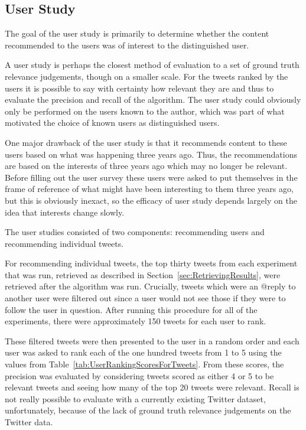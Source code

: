 \subsection{User Study}
\label{sec:UserStudy}

The goal of the user study is primarily to determine whether the content recommended to the users was of interest to the distinguished user.

A user study is perhaps the closest method of evaluation to a set of ground truth relevance judgements, though on a smaller scale. For the tweets ranked by the users it is possible to say with certainty how relevant they are and thus to evaluate the precision and recall of the algorithm. The user study could obviously only be performed on the users known to the author, which was part of what motivated the choice of known users as distinguished users.

One major drawback of the user study is that it recommends content to these users based on what was happening three years ago. Thus, the recommendations are based on the interests of three years ago which may no longer be relevant. Before filling out the user survey these users were asked to put themselves in the frame of reference of what might have been interesting to them three years ago, but this is obviously inexact, so the efficacy of user study depends largely on the idea that interests change slowly.

The user studies consisted of two components: recommending users and recommending individual tweets. 

For recommending individual tweets, the top thirty tweets from each experiment that was run, retrieved as described in Section~\ref{sec:RetrievingResults}, were retrieved after the algorithm was run. Crucially, tweets which were an @reply to another user were filtered out since a user would not see those if they were to follow the user in question. After running this procedure for all of the experiments, there were approximately 150 tweets for each user to rank.

These filtered tweets were then presented to the user in a random order and each user was asked to rank each of the one hundred tweets from 1 to 5 using the values from Table~\ref{tab:UserRankingScoresForTweets}. From these scores, the precision was evaluated by considering tweets scored as either 4 or 5 to be relevant tweets and seeing how many of the top 20 tweets were relevant. Recall is not really possible to evaluate with a currently existing Twitter dataset, unfortunately, because of the lack of ground truth relevance judgements on the Twitter data.



